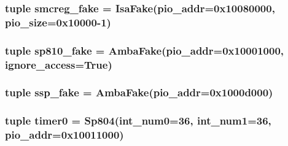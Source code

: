 \label{classRealView_1_1RealViewEB_ae5f924bae96d172d477be2bfc6df2004}
\hypertarget{classRealView_1_1RealViewEB_a81ce9ec26608ce51a51be37cbd1dfca3}{
\subsubsection[{smcreg\_\-fake}]{\setlength{\rightskip}{0pt plus 5cm}tuple {\bf smcreg\_\-fake} = {\bf IsaFake}(pio\_\-addr=0x10080000, pio\_\-size=0x10000-\/1)}}
\label{classRealView_1_1RealViewEB_a81ce9ec26608ce51a51be37cbd1dfca3}
\hypertarget{classRealView_1_1RealViewEB_a42d6450a02aa42b77cd21f39eb6a3fbb}{
\subsubsection[{sp810\_\-fake}]{\setlength{\rightskip}{0pt plus 5cm}tuple {\bf sp810\_\-fake} = {\bf AmbaFake}(pio\_\-addr=0x10001000, ignore\_\-access=True)}}
\label{classRealView_1_1RealViewEB_a42d6450a02aa42b77cd21f39eb6a3fbb}
\hypertarget{classRealView_1_1RealViewEB_a663792173a35cbb5279a335c3cda0e15}{
\subsubsection[{ssp\_\-fake}]{\setlength{\rightskip}{0pt plus 5cm}tuple {\bf ssp\_\-fake} = {\bf AmbaFake}(pio\_\-addr=0x1000d000)}}
\label{classRealView_1_1RealViewEB_a663792173a35cbb5279a335c3cda0e15}
\hypertarget{classRealView_1_1RealViewEB_af4ebf9ec12f4c51e9fd2eee3647a3932}{
\subsubsection[{timer0}]{\setlength{\rightskip}{0pt plus 5cm}tuple {\bf timer0} = {\bf Sp804}(int\_\-num0=36, int\_\-num1=36, pio\_\-addr=0x10011000)}}
